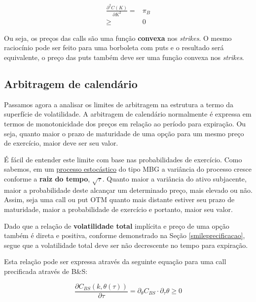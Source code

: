 \documentclass[]{book}
\begin{document}
\begin{equation}
\begin{aligned}
\frac{\partial^2 C(K)}{\partial K^2}=& \pi_B\\
\geq & 0
\end{aligned}
\label{eq:arbborboleta}
\end{equation}

Ou seja, os preços das calls são uma função \textbf{convexa} nos
\emph{strikes}. O mesmo raciocínio pode ser feito para uma borboleta com
puts e o resultado será equivalente, o preço das puts também deve ser
uma função convexa nos \emph{strikes}.

\subsection{Arbitragem de calendário}\label{arbitragem-de-calendario}

Passamos agora a analisar os limites de arbitragem na estrutura a termo
da superfície de volatilidade. A arbitragem de calendário normalmente é
expressa em termos de monotonicidade dos preços em relação ao período
para expiração. Ou seja, quanto maior o prazo de maturidade de uma opção
para um mesmo preço de exercício, maior deve ser seu valor.

É fácil de entender este limite com base nas probabilidades de
exercício. Como sabemos, em um
\protect\hyperlink{processos-estocasticos}{processo estocástico} do tipo
MBG a variância do processo cresce conforme a \textbf{raiz do tempo},
\(\sqrt{\tau}\). Quanto maior a variância do ativo subjacente, maior a
probabilidade deste alcançar um determinado preço, mais elevado ou não.
Assim, seja uma call ou put OTM quanto mais distante estiver seu prazo
de maturidade, maior a probabilidade de exercício e portanto, maior seu
valor.

Dado que a relação de \textbf{volatilidade total} implícita e preço de
uma opção também é direta e positiva, conforme demonstrado na Seção
\ref{smileprecificacao}, segue que a volatilidade total deve ser não
decrescente no tempo para expiração.

Esta relação pode ser expressa através da seguinte equação para uma call
precificada através de B\&S:

\begin{equation}
\frac{\partial C_{BS}(k, \theta(\tau))}{\partial \tau}=\partial_\theta C_{BS}\cdot\partial_\tau \theta \geq 0
\label{eq:arbcalendario}
\end{equation}
\end{document}
